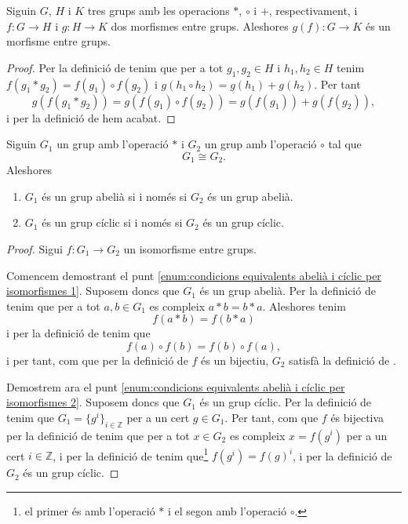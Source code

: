 \documentclass[../Apunts.tex]{subfiles}
\begin{document}
	\begin{proposition}\label{prop:conjugació de morfismes entre grups és morfisme entre grups}
		Siguin \(G\), \(H\) i \(K\) tres grups amb les operacions \(\ast\), \(\circ\) i \(+\), respectivament, i \(f\colon G\longrightarrow H\) i \(g\colon H\longrightarrow K\) dos morfismes entre grups. Aleshores \(g(f)\colon G\longrightarrow K\) és un morfisme entre grups.
		\begin{proof}
			Per la definició de  tenim que per a tot \(g_{1},g_{2}\in H\) i \(h_{1},h_{2}\in H\) tenim \(f(g_{1}\ast g_{2})=f(g_{1})\circ f(g_{2})\) i \(g(h_{1}\circ h_{2})=g(h_{1})+g(h_{2})\). Per tant
			\[g(f(g_{1}\ast g_{2}))=g(f(g_{1})\circ f(g_{2}))=g(f(g_{1}))+g(f(g_{2})),\]
			i per la definició de  hem acabat.
		\end{proof}
	\end{proposition}
	\begin{proposition}
		\label{prop:condicions equivalents abelià i cíclic per isomorfismes}
		Siguin \(G_{1}\) un grup amb l'operació \(\ast\) i \(G_{2}\) un grup amb l'operació \(\circ\) tal que
		\[G_{1}\cong G_{2}.\]
		Aleshores
		\begin{enumerate}
			\item\label{enum:condicions equivalents abelià i cíclic per isomorfismes 1} \(G_{1}\) és un grup abelià si i només si \(G_{2}\) és un grup abelià.
			\item\label{enum:condicions equivalents abelià i cíclic per isomorfismes 2} \(G_{1}\) és un grup cíclic si i només si \(G_{2}\) és un grup cíclic.
		\end{enumerate}
		\begin{proof}
			Sigui \(f\colon G_{1}\to G_{2}\) un isomorfisme entre grups.
			
			Comencem demostrant el punt \eqref{enum:condicions equivalents abelià i cíclic per isomorfismes 1}. Suposem doncs que \(G_{1}\) és un grup abelià. Per la definició de  tenim que per a tot \(a,b\in G_{1}\) es compleix \(a\ast b=b\ast a\). Aleshores tenim
			\[f(a\ast b)=f(b\ast a)\]
			i per la definició de  tenim que
			\[f(a)\circ f(b)=f(b)\circ f(a),\]
			i per tant, com que per la definició de  \(f\) és un bijectiu, \(G_{2}\) satisfà la definició de .
			
			Demostrem ara el punt \eqref{enum:condicions equivalents abelià i cíclic per isomorfismes 2}. Suposem doncs que \(G_{1}\) és un grup cíclic. Per la definició de  tenim que \(G_{1}=\{g^{i}\}_{i\in\mathbb{Z}}\) per a un cert \(g\in G_{1}\). Per tant, com que \(f\) és bijectiva per la definició de  tenim que per a tot \(x\in G_{2}\) es compleix \(x=f(g^{i})\) per a un cert \(i\in\mathbb{Z}\), i per la definició de  tenim que\footnote{el primer és amb l'operació \(\ast\) i el segon amb l'operació \(\circ\).} \(f(g^{i})=f(g)^{i}\), i per la definició de  \(G_{2}\) és un grup cíclic.
		\end{proof}
	\end{proposition}
\end{document}
